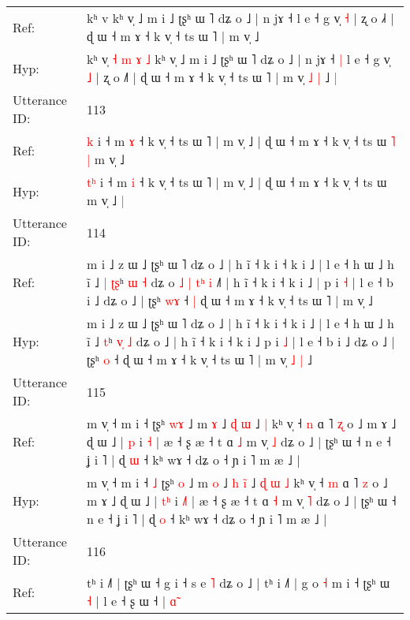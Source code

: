 \documentclass[10pt]{article}
\DeclareRobustCommand{\hl}[1]{{\textcolor{red}{#1}}}
\begin{document}
\begin{longtable}{ll}
Ref: & kʰ v\hl{}\hl{}\hl{}\hl{}\hl{}\hl{}\hl{}\hl{}\hl{} kʰ v̩ ˩ m i ˩ ʈʂʰ ɯ ˥ dʑ o ˩ | n jɤ ˧\hl{}\hl{} l e ˧ g v̩ \hl{˧} | ʐ o ˩\hl{˧} | ɖ ɯ ˧ m ɤ ˧ k v̩ ˧ ts ɯ ˥ | m v̩\hl{}\hl{}\hl{}\hl{} ˩\hl{}\hl{}
 \\
Hyp: & kʰ v\hl{̩}\hl{ }\hl{˧}\hl{ }\hl{m}\hl{ }\hl{ɤ}\hl{ }\hl{˩} kʰ v̩ ˩ m i ˩ ʈʂʰ ɯ ˥ dʑ o ˩ | n jɤ ˧\hl{ }\hl{|} l e ˧ g v̩ \hl{˩} | ʐ o ˩\hl{˥} | ɖ ɯ ˧ m ɤ ˧ k v̩ ˧ ts ɯ ˥ | m v̩\hl{ }\hl{˩}\hl{ }\hl{|} ˩\hl{ }\hl{|}
 \\
\midrule
Utterance ID: & 113 \\
Ref: & \hl{}\hl{k} i ˧ m \hl{ɤ} ˧ k v̩ ˧ ts ɯ ˥ | m v̩ ˩ | ɖ ɯ ˧ m ɤ ˧ k v̩ ˧ ts ɯ\hl{ }\hl{˥}\hl{ }\hl{|} m v̩ ˩\hl{}\hl{}
 \\
Hyp: & \hl{t}\hl{ʰ} i ˧ m \hl{i} ˧ k v̩ ˧ ts ɯ ˥ | m v̩ ˩ | ɖ ɯ ˧ m ɤ ˧ k v̩ ˧ ts ɯ\hl{}\hl{}\hl{}\hl{} m v̩ ˩\hl{ }\hl{|}
 \\
\midrule
Utterance ID: & 114 \\
Ref: & m i ˩ z ɯ ˩ ʈʂʰ ɯ ˥ dʑ o ˩ | h ĩ ˧ k i ˧ k i ˩ | l e ˧ h ɯ ˩ h ĩ ˩\hl{ }\hl{|} \hl{ʈ}\hl{ʂ}ʰ \hl{}\hl{ɯ} \hl{˧} dʑ o\hl{ }\hl{˩}\hl{ }\hl{|}\hl{ }\hl{t}\hl{ʰ}\hl{ }\hl{i} ˩\hl{˥} | h ĩ ˧ k i ˧ k i ˩\hl{ }\hl{|} p i \hl{˧} | l e ˧ b i ˩ dʑ o ˩ | ʈʂʰ \hl{w}\hl{ɤ} ˧\hl{ }\hl{|} ɖ ɯ ˧ m ɤ ˧ k v̩ ˧ ts ɯ ˥ | m v̩\hl{}\hl{}\hl{}\hl{} ˩
 \\
Hyp: & m i ˩ z ɯ ˩ ʈʂʰ ɯ ˥ dʑ o ˩ | h ĩ ˧ k i ˧ k i ˩ | l e ˧ h ɯ ˩ h ĩ ˩\hl{}\hl{} \hl{}\hl{t}ʰ \hl{v}\hl{̩} \hl{˩} dʑ o\hl{}\hl{}\hl{}\hl{}\hl{}\hl{}\hl{}\hl{}\hl{} ˩\hl{} | h ĩ ˧ k i ˧ k i ˩\hl{}\hl{} p i \hl{˩} | l e ˧ b i ˩ dʑ o ˩ | ʈʂʰ \hl{}\hl{o} ˧\hl{}\hl{} ɖ ɯ ˧ m ɤ ˧ k v̩ ˧ ts ɯ ˥ | m v̩\hl{ }\hl{˩}\hl{ }\hl{|} ˩
 \\
\midrule
Utterance ID: & 115 \\
Ref: & m v̩ ˧ m i ˧\hl{}\hl{} ʈʂʰ \hl{w}\hl{ɤ} ˩ m \hl{ɤ} ˩ \hl{ɖ} \hl{}\hl{ɯ} ˩\hl{}\hl{}\hl{}\hl{} \hl{|} kʰ v̩ ˧ \hl{n} ɑ ˥ \hl{ʐ} o ˩ m ɤ ˩ ɖ ɯ ˩ | \hl{}\hl{p} i \hl{}\hl{˧} | æ ˧ ʂ æ ˧ t ɑ \hl{˩} m v̩ \hl{˩} dʑ o ˩ | ʈʂʰ ɯ ˧ n e ˧ ʝ i ˥ | ɖ \hl{ɯ} ˧ kʰ wɤ ˧ dʑ o ˧ ɲ i ˥ m æ ˩ |
 \\
Hyp: & m v̩ ˧ m i ˧\hl{ }\hl{˩} ʈʂʰ \hl{}\hl{o} ˩ m \hl{o} ˩ \hl{h} \hl{i}\hl{̃} ˩\hl{ }\hl{ɖ}\hl{ }\hl{ɯ} \hl{˩} kʰ v̩ ˧ \hl{m} ɑ ˥ \hl{z} o ˩ m ɤ ˩ ɖ ɯ ˩ | \hl{t}\hl{ʰ} i \hl{˩}\hl{˥} | æ ˧ ʂ æ ˧ t ɑ \hl{˧} m v̩ \hl{˥} dʑ o ˩ | ʈʂʰ ɯ ˧ n e ˧ ʝ i ˥ | ɖ \hl{o} ˧ kʰ wɤ ˧ dʑ o ˧ ɲ i ˥ m æ ˩ |
 \\
\midrule
Utterance ID: & 116 \\
Ref: & tʰ i ˩˥ | ʈʂʰ ɯ ˧ g i ˧ s e \hl{˥} dʑ o ˩ | tʰ i ˩˥ | g o\hl{ }\hl{˧} m i ˧ ʈʂʰ ɯ \hl{˧} | l e ˧ ʂ ɯ ˧ | \hl{ɑ}̃

\end{longtable}
\end{document}
